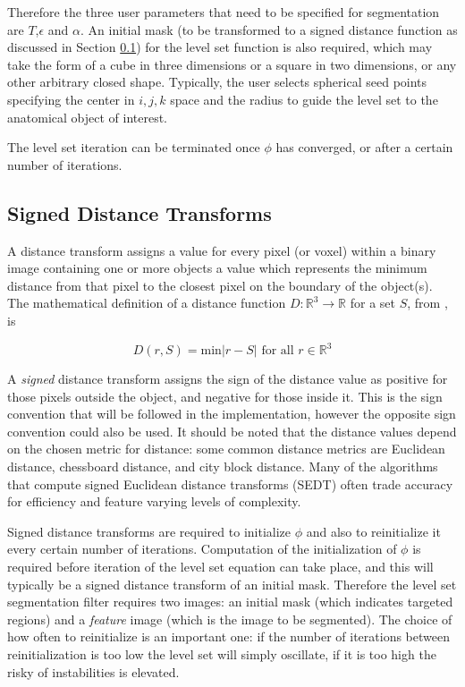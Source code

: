 Therefore the three user parameters that need to be specified for segmentation are $T$,$\epsilon$ and $\alpha$. An initial mask (to be transformed to a signed distance function as discussed in Section \ref{sdf}) for the level set function is also required, which may take the form of a cube in three dimensions or a square in two dimensions, or any other arbitrary closed shape. Typically, the user selects spherical seed points specifying the center in $i,j,k$ space and the radius to guide the level set to the anatomical object of interest.

The level set iteration can be terminated once $\phi$ has converged, or after a certain number of iterations. 


	\subsection{Signed Distance Transforms}\label{sdf}
A distance transform assigns a value for every pixel (or voxel) within a binary image containing one or more objects a value which represents the minimum distance from that pixel to the closest pixel on the boundary of the object(s). The mathematical definition of a distance function $D:\mathbb{R}^3 \rightarrow \mathbb{R}$ for a set $S$, from \cite{oshersethian}, is
	
	\begin{equation}
	D(r,S) = \textrm{min}{|r-S|} \textrm{ for all } r \in \mathbb{R}^3
	\label{eq:distancetransform}
	\end{equation}

A \textit{signed} distance transform assigns the sign of the distance value as positive for those pixels outside the object, and negative for those inside it. This is the sign convention that will be followed in the implementation, however the opposite sign convention could also be used. It should be noted that the distance values depend on the chosen metric for distance: some common distance metrics are Euclidean distance, chessboard distance, and city block distance. Many of the algorithms that compute signed Euclidean distance transforms (SEDT) often trade accuracy for efficiency and feature varying levels of complexity.

Signed distance transforms are required to initialize $\phi$ and also to reinitialize it every certain number of iterations. Computation of the initialization of $\phi$ is required before iteration of the level set equation can take place, and this will typically be a signed distance transform of an initial mask. Therefore the level set segmentation filter requires two images: an initial mask (which indicates targeted regions) and a \textit{feature} image (which is the image to be segmented). 
The choice of how often to reinitialize is an important one: if the number of iterations between reinitialization is too low the level set will simply oscillate, if it is too high the risky of instabilities is elevated. 
	
